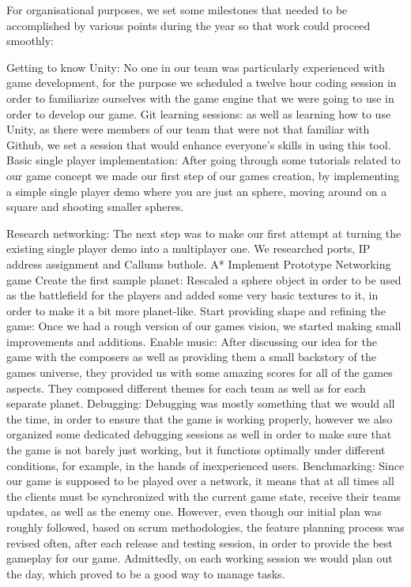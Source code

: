\documentclass[11pt,a4paper]{article}
\begin{document}
        For organisational purposes, we set some milestones that needed to be accomplished by various points during the year so that work could proceed smoothly:

        Getting to know Unity: No one in our team was particularly experienced with game development, for the purpose we scheduled a twelve hour coding session in order to familiarize ourselves with the game engine that we were going to use in order to develop our game.
        Git learning sessions: as well as learning how to use Unity, as there were members of our team that were not that familiar with Github, we set a session that would enhance everyone’s skills in using this tool.
        Basic single player implementation: After going through some tutorials related to our game concept we made our first step of our games creation, by implementing a simple single player demo where you are just an sphere, moving around on a square and shooting smaller spheres.

        Research networking: The next step was to make our first attempt at turning the existing single player demo into a multiplayer one. We researched ports, IP address assignment and Callums buthole. A*
        Implement Prototype Networking game 
        Create the first sample planet: Rescaled a sphere object in order to be used as the battlefield for the players and added some very basic textures to it, in order to make it a bit more planet-like.
        Start providing shape and refining the game: Once we had a rough version of our games vision, we started making small improvements and additions.  
        Enable music: After discussing our idea for the game with the composers as well as providing them a small backstory of the games universe, they provided us with some amazing scores for all of the games aspects. They composed different themes for each team as well as for each separate planet.
        Debugging: Debugging was mostly something that we would all the time, in order to ensure that the game is working properly, however we also organized some dedicated debugging sessions as well in order to make sure that the game is not barely just working, but it functions optimally under different conditions, for example, in the hands of inexperienced users.
        Benchmarking: Since our game is supposed to be played over a network, it means that at all times all the clients must be synchronized with the current game state, receive their teams updates, as well as the enemy one. 
        However, even though our initial plan was roughly followed, based on scrum methodologies, the feature planning process was revised often, after each release and testing session, in order to provide the best gameplay for our game. Admittedly, on each working session we would plan out the day, which proved to be a good way to manage tasks.
\end{document}

